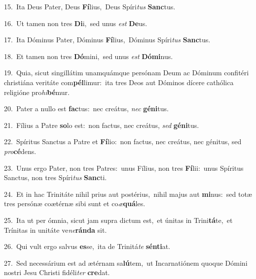 {\numbfont\textcolor{\numbcolor}{15.}}~Ita Deus Pater, Deus \textbf{Fí}\-lius,~\star Deus Spíri\textit{tus} \textbf{Sanc}\-tus.\par
{\numbfont\textcolor{\numbcolor}{16.}}~Ut tamen non tres \textbf{Di}\-i,~\star sed unus \textit{est} \textbf{De}\-us.\par
{\numbfont\textcolor{\numbcolor}{17.}}~Ita Dóminus Pater, Dóminus \textbf{Fí}\-lius,~\star Dóminus Spíri\textit{tus} \textbf{Sanc}\-tus.\par
{\numbfont\textcolor{\numbcolor}{18.}}~Et tamen non tres \textbf{Dó}\-mini,~\star sed unus \textit{est} \textbf{Dó}\-\textbf{mi}nus.\par
{\numbfont\textcolor{\numbcolor}{19.}}~Quia, sicut singillátim unamquámque persónam Deum ac Dóminum confitéri christiána veritáte com\-\textbf{pél}\-limur:~\star ita tres Deos aut Dóminos dícere cathólica religióne pro\-\textit{hi}\-\textbf{bé}mur.\par
{\numbfont\textcolor{\numbcolor}{20.}}~Pater a nullo est \textbf{fac}\-tus:~\star nec creátus, \textit{nec} \textbf{gé}\-\textbf{ni}tus.\par
{\numbfont\textcolor{\numbcolor}{21.}}~Fílius a Patre \textbf{so}\-lo est:~\star non factus, nec creátus, \textit{sed} \textbf{gé}\-\textbf{ni}tus.\par
{\numbfont\textcolor{\numbcolor}{22.}}~Spíritus Sanctus a Patre et \textbf{Fí}\-lio:~\star non factus, nec creátus, nec génitus, sed \textit{pro}\-\textbf{cé}dens.\par
{\numbfont\textcolor{\numbcolor}{23.}}~Unus ergo Pater, non tres Patres:~\dagger unus Fílius, non tres \textbf{Fí}\-lii:~\star unus Spíritus Sanctus, non tres Spíri\textit{tus} \textbf{Sanc}\-ti.\par
{\numbfont\textcolor{\numbcolor}{24.}}~Et in hac Trinitáte nihil prius aut postérius,~\dagger nihil majus aut \textbf{mi}\-nus:~\star sed totæ tres persónæ coætérnæ sibi sunt et co\-\textit{æ}\-\textbf{quá}les.\par
{\numbfont\textcolor{\numbcolor}{25.}}~Ita ut per ómnia, sicut jam supra dictum est,~\dagger et únitas in Trini\-\textbf{tá}\-te,~\star et Trínitas in unitáte ve\-\textit{ne}\-\textbf{rán}\textbf{da} sit.\par
{\numbfont\textcolor{\numbcolor}{26.}}~Qui vult ergo salvus \textbf{es}\-se,~\star ita de Trinitá\textit{te} \textbf{sén}\-\textbf{ti}at.\par
{\numbfont\textcolor{\numbcolor}{27.}}~Sed necessárium est ad ætérnam sa\-\textbf{lú}\-tem,~\star ut Incarnatiónem quoque Dómini nostri Jesu Christi fidéli\textit{ter} \textbf{cre}\-dat.\par
